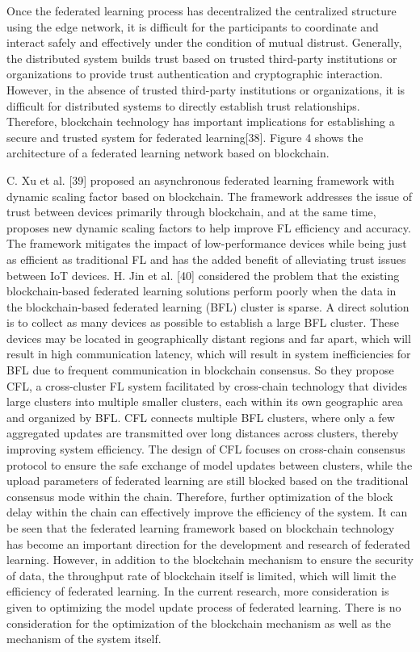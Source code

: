 \documentclass[lettersize,journal]{IEEEtran}
\begin{document}
Once the federated learning process has decentralized the centralized structure using the edge network, it is difficult for the participants to coordinate and interact safely and effectively under the condition of mutual distrust. Generally, the distributed system builds trust based on trusted third-party institutions or organizations to provide trust authentication and cryptographic interaction. However, in the absence of trusted third-party institutions or organizations, it is difficult for distributed systems to directly establish trust relationships. Therefore, blockchain technology has important implications for establishing a secure and trusted system for federated learning[38]. Figure 4 shows the architecture of a federated learning network based on blockchain.

C. Xu et al. [39] proposed an asynchronous federated learning framework with dynamic scaling factor based on blockchain. The framework addresses the issue of trust between devices primarily through blockchain, and at the same time, proposes new dynamic scaling factors to help improve FL efficiency and accuracy. The framework mitigates the impact of low-performance devices while being just as efficient as traditional FL and has the added benefit of alleviating trust issues between IoT devices. H. Jin et al. [40] considered the problem that the existing blockchain-based federated learning solutions perform poorly when the data in the blockchain-based federated learning (BFL) cluster is sparse. A direct solution is to collect as many devices as possible to establish a large BFL cluster. These devices may be located in geographically distant regions and far apart, which will result in high communication latency, which will result in system inefficiencies for BFL due to frequent communication in blockchain consensus. So they propose CFL, a cross-cluster FL system facilitated by cross-chain technology that divides large clusters into multiple smaller clusters, each within its own geographic area and organized by BFL. CFL connects multiple BFL clusters, where only a few aggregated updates are transmitted over long distances across clusters, thereby improving system efficiency. The design of CFL focuses on cross-chain consensus protocol to ensure the safe exchange of model updates between clusters, while the upload parameters of federated learning are still blocked based on the traditional consensus mode within the chain. Therefore, further optimization of the block delay within the chain can effectively improve the efficiency of the system. It can be seen that the federated learning framework based on blockchain technology has become an important direction for the development and research of federated learning. However, in addition to the blockchain mechanism to ensure the security of data, the throughput rate of blockchain itself is limited, which will limit the efficiency of federated learning. In the current research, more consideration is given to optimizing the model update process of federated learning. There is no consideration for the optimization of the blockchain mechanism as well as the mechanism of the system itself.
\end{document}

